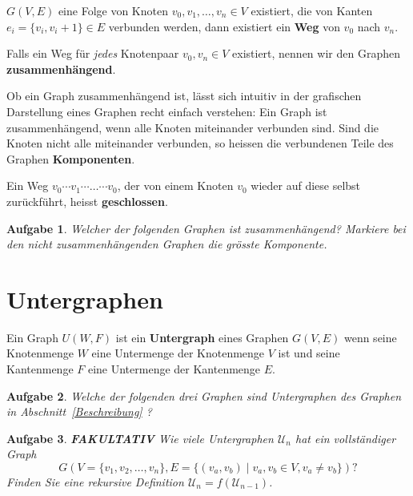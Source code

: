 \documentclass[12pt,a4paper]{report}
\theoremstyle{break}
\newtheorem{exercise}{Aufgabe}[section]
\theoremstyle{plain}
\begin{document}
$G(V,E)$ eine Folge von Knoten $v_0, v_1,
\ldots, v_n \in V$ existiert, die von Kanten $e_i = \{v_i, v_i+1\} \in
E$ verbunden werden, dann existiert ein \textbf{Weg} von $v_0$ nach
$v_n$. 

Falls ein Weg f\"{u}r \emph{jedes} Knotenpaar $v_0, v_n
\in V$ existiert, nennen wir den Graphen \textbf{zusammenh\"{a}ngend}.

Ob ein Graph zusammenh\"{a}ngend ist, l\"{a}sst sich intuitiv in der grafischen 
Darstellung eines Graphen recht einfach verstehen: Ein Graph
ist zusammenh\"{a}ngend, wenn alle Knoten miteinander verbunden sind. Sind
die Knoten nicht alle miteinander verbunden, so heissen die verbundenen Teile des 
Graphen \textbf{Komponenten}.

Ein Weg $v_0\cdots{v_1}\cdots\ldots\cdots{v_0}$, der von einem Knoten
$v_0$ wieder auf diese selbst zur\"{u}ckf\"{u}hrt, heisst
\textbf{geschlossen}.

\begin{exercise}
Welcher der folgenden Graphen ist zusammenh\"{a}ngend? Markiere bei den nicht zusammenh\"{a}ngenden Graphen die
gr\"{o}sste Komponente.

\end{exercise}
\section{Untergraphen}

Ein Graph $U(W,F)$ ist ein \textbf{Untergraph} eines Graphen $G(V,E)$
wenn seine Knotenmenge $W$ eine Untermenge der Knotenmenge $V$ ist und
seine Kantenmenge $F$ eine Untermenge der Kantenmenge $E$.

\begin{exercise}\label{exunter}
Welche der folgenden drei Graphen sind Untergraphen des Graphen in
Abschnitt~\ref{Beschreibung} ?


\end{exercise}
\begin{exercise}
\textbf{FAKULTATIV} Wie viele Untergraphen $\mathcal{U}_n$ hat ein
\emph{vollst\"{a}ndiger} Graph 
\[ 
G(V = \{v_1, v_2, \ldots, v_n\}, E = \{(v_a, v_b) \mid v_a, v_b \in V,
v_a \neq v_b\}) ?
\] 
Finden Sie eine rekursive Definition $\mathcal{U}_n = f(\mathcal{U}_{n-1})$.
\end{exercise}
\end{document}
